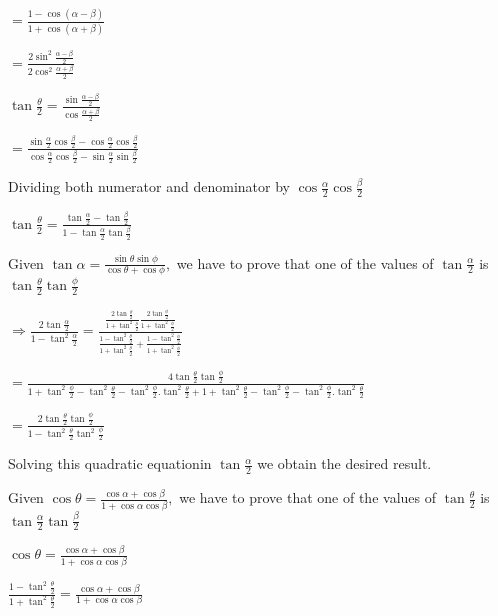   $= \frac{1 - \cos(\alpha - \beta)}{1 + \cos(\alpha + \beta)}$

  $= \frac{2\sin^2\frac{\alpha - \beta}{2}}{2\cos^2\frac{\alpha + \beta}{2}}$

  $\tan\frac{\theta}{2} = \frac{\sin\frac{\alpha - \beta}{2}}{\cos\frac{\alpha + \beta}{2}}$

  $= \frac{\sin\frac{\alpha}{2}\cos\frac{\beta}{2} -
  \cos\frac{\alpha}{2}\cos\frac{\beta}{2}}{\cos\frac{\alpha}{2}\cos\frac{\beta}{2} - \sin\frac{\alpha}{2}\sin\frac{\beta}{2}}$

  Dividing both numerator and denominator by $\cos\frac{\alpha}{2}\cos\frac{\beta}{2}$

  $\tan\frac{\theta}{2} = \frac{\tan \frac{\alpha}{2} - \tan\frac{\beta}{2}}{1 -
    \tan\frac{\alpha}{2}\tan\frac{\beta}{2}}$

\item Given $\tan\alpha = \frac{\sin\theta\sin\phi}{\cos\theta + \cos\phi},$ we have to prove that one of the values of
  $\tan\frac{\alpha}{2}$ is $\tan\frac{\theta}{2}\tan\frac{\phi}{2}$

  $\Rightarrow \frac{2\tan\frac{\alpha}{2}}{1 - \tan^2\frac{\alpha}{2}} = \frac{\frac{2\tan\frac{\theta}{2}}{1 +
    \tan^2\frac{\theta}{2}}\frac{2\tan\frac{\phi}{2}}{1 + \tan^2\frac{\phi}{2}}}{\frac{1 - \tan^2\frac{\theta}{2}}{1 +
    \tan^2\frac{\theta}{2}} + \frac{1 - \tan^2\frac{\phi}{2}}{1 + \tan^2\frac{\phi}{2}}}$

  $= \frac{4\tan\frac{\theta}{2}\tan\frac{\phi}{2}}{1 + \tan^2\frac{\phi}{2} - \tan^2\frac{\theta}{2} -
  \tan^2\frac{\phi}{2}.\tan^2\frac{\theta}{2} + 1 + \tan^2\frac{\theta}{2} -\tan^2\frac{\phi}{2} -
  \tan^2\frac{\phi}{2}.\tan^2\frac{\theta}{2}}$

  $= \frac{2\tan\frac{\theta}{2}\tan\frac{\phi}{2}}{1 - \tan^2\frac{\theta}{2}\tan^2\frac{\phi}{2}}$

  Solving this quadratic equationin $\tan\frac{\alpha}{2}$ we obtain the desired result.

\item Given $\cos\theta = \frac{\cos\alpha + \cos\beta}{1 + \cos\alpha\cos\beta},$ we have to prove that one of the values of
  $\tan\frac{\theta}{2}$ is $\tan\frac{\alpha}{2}\tan\frac{\beta}{2}$

  $\cos\theta = \frac{\cos\alpha + \cos\beta}{1 + \cos\alpha\cos\beta}$

  $\frac{1 - \tan^2\frac{\theta}{2}}{1 + \tan^2\frac{\theta}{2}} = \frac{\cos\alpha + \cos\beta}{1 + \cos\alpha\cos\beta}$

